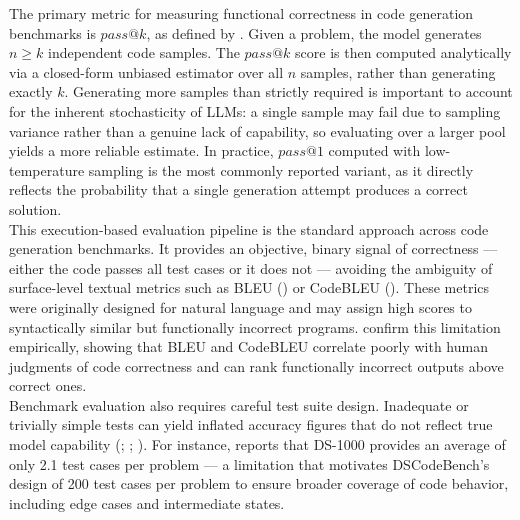 \documentclass[mscthesis]{usiinfthesis}
\begin{document}
The primary metric for measuring functional correctness in code generation benchmarks is $pass@k$, as defined by \citet{DBLP:journals/corr/abs-2107-03374}. Given a problem, the model generates $n \geq k$ independent code samples. The $pass@k$ score is then computed analytically via a closed-form unbiased estimator over all $n$ samples, rather than generating exactly $k$. Generating more samples than strictly required is important to account for the inherent stochasticity of LLMs: a single sample may fail due to sampling variance rather than a genuine lack of capability, so evaluating over a larger pool yields a more reliable estimate. In practice, $pass@1$ computed with low-temperature sampling is the most commonly reported variant, as it directly reflects the probability that a single generation attempt produces a correct solution.\\

This execution-based evaluation pipeline is the standard approach across code generation benchmarks. It provides an objective, binary signal of correctness — either the code passes all test cases or it does not — avoiding the ambiguity of surface-level textual metrics such as BLEU (\citet{BLUEamethodforautomaticevaluationofmachinetranslation}) or CodeBLEU (\citet{ren2020codebleumethodautomaticevaluation}). These metrics were originally designed for natural language and may assign high scores to syntactically similar but functionally incorrect programs. \citet{Evtikhiev_2023} confirm this limitation empirically, showing that BLEU and CodeBLEU correlate poorly with human judgments of code correctness and can rank functionally incorrect outputs above correct ones.\\

Benchmark evaluation also requires careful test suite design. Inadequate or trivially simple tests can yield inflated accuracy figures that do not reflect true model capability (\citet{zhang2024naturalcodebenchexaminingcodingperformance}; \citet{ouyang2025dscodebenchrealisticbenchmarkdata}; \citet{koohestani2025benchmarkingaimodelssoftware}). For instance, \citet{ouyang2025dscodebenchrealisticbenchmarkdata} reports that DS-1000 provides an average of only 2.1 test cases per problem — a limitation that motivates DSCodeBench's design of 200 test cases per problem to ensure broader coverage of code behavior, including edge cases and intermediate states.\\
\end{document}

